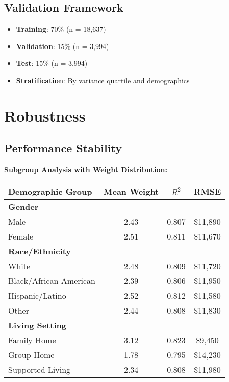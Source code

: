\subsection{Validation Framework}

\begin{itemize}
    \item \textbf{Training}: 70\% (n = 18,637)
    \item \textbf{Validation}: 15\% (n = 3,994)
    \item \textbf{Test}: 15\% (n = 3,994)
    \item \textbf{Stratification}: By variance quartile and demographics
\end{itemize}

\section{Robustness}

\subsection{Performance Stability}

\textbf{Subgroup Analysis with Weight Distribution:}
\begin{center}
\begin{tabular}{lccc}
\toprule
Demographic Group & Mean Weight & $R^2$ & RMSE \\
\midrule
\textbf{Gender} & & & \\
Male & 2.43 & 0.807 & \$11,890 \\
Female & 2.51 & 0.811 & \$11,670 \\
\midrule
\textbf{Race/Ethnicity} & & & \\
White & 2.48 & 0.809 & \$11,720 \\
Black/African American & 2.39 & 0.806 & \$11,950 \\
Hispanic/Latino & 2.52 & 0.812 & \$11,580 \\
Other & 2.44 & 0.808 & \$11,830 \\
\midrule
\textbf{Living Setting} & & & \\
Family Home & 3.12 & 0.823 & \$9,450 \\
Group Home & 1.78 & 0.795 & \$14,230 \\
Supported Living & 2.34 & 0.808 & \$11,980 \\
\bottomrule
\end{tabular}
\end{center}

